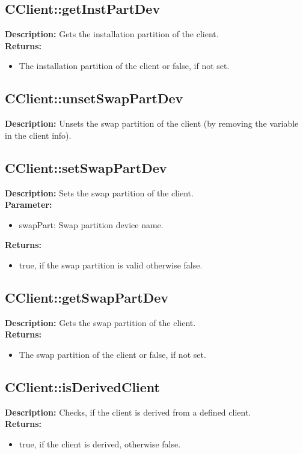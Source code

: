 \subsection{CClient::getInstPartDev}
\textbf{Description:} Gets the installation partition of the client.\\
\textbf{Returns:}
\begin{itemize}
\item The installation partition of the client or false, if not set.
\end{itemize}

\subsection{CClient::unsetSwapPartDev}
\textbf{Description:} Unsets the swap partition of the client (by removing the variable in the client info).\\

\subsection{CClient::setSwapPartDev}
\textbf{Description:} Sets the swap partition of the client.\\
\textbf{Parameter:}
\begin{itemize}
\item swapPart: Swap partition device name.
\end{itemize}
\textbf{Returns:}
\begin{itemize}
\item true, if the swap partition is valid otherwise false.
\end{itemize}

\subsection{CClient::getSwapPartDev}
\textbf{Description:} Gets the swap partition of the client.\\
\textbf{Returns:}
\begin{itemize}
\item The swap partition of the client or false, if not set.
\end{itemize}

\subsection{CClient::isDerivedClient}
\textbf{Description:} Checks, if the client is derived from a defined client.\\
\textbf{Returns:}
\begin{itemize}
\item true, if the client is derived, otherwise false.
\end{itemize}

